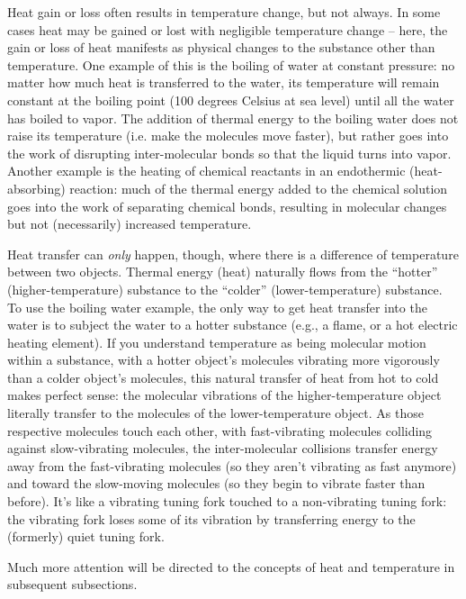 Heat gain or loss often results in temperature change, but not always.  In some cases heat may be gained or lost with negligible temperature change -- here, the gain or loss of heat manifests as physical changes to the substance other than temperature.  One example of this is the boiling of water at constant pressure: no matter how much heat is transferred to the water, its temperature will remain constant at the boiling point (100 degrees Celsius at sea level) until all the water has boiled to vapor.  The addition of thermal energy to the boiling water does not raise its temperature (i.e. make the molecules move faster), but rather goes into the work of disrupting inter-molecular bonds so that the liquid turns into vapor.  Another example is the heating of chemical reactants in an endothermic (heat-absorbing) reaction: much of the thermal energy added to the chemical solution goes into the work of separating chemical bonds, resulting in molecular changes but not (necessarily) increased temperature.

Heat transfer can \textit{only} happen, though, where there is a difference of temperature between two objects.  Thermal energy (heat) naturally flows from the ``hotter'' (higher-temperature) substance to the ``colder'' (lower-temperature) substance.  To use the boiling water example, the only way to get heat transfer into the water is to subject the water to a hotter substance (e.g., a flame, or a hot electric heating element).  If you understand temperature as being molecular motion within a substance, with a hotter object's molecules vibrating more vigorously than a colder object's molecules, this natural transfer of heat from hot to cold makes perfect sense: the molecular vibrations of the higher-temperature object literally transfer to the molecules of the lower-temperature object.  As those respective molecules touch each other, with fast-vibrating molecules colliding against slow-vibrating molecules, the inter-molecular collisions transfer energy away from the fast-vibrating molecules (so they aren't vibrating as fast anymore) and toward the slow-moving molecules (so they begin to vibrate faster than before).  It's like a vibrating tuning fork touched to a non-vibrating tuning fork: the vibrating fork loses some of its vibration by transferring energy to the (formerly) quiet tuning fork.

Much more attention will be directed to the concepts of heat and temperature in subsequent subsections.





